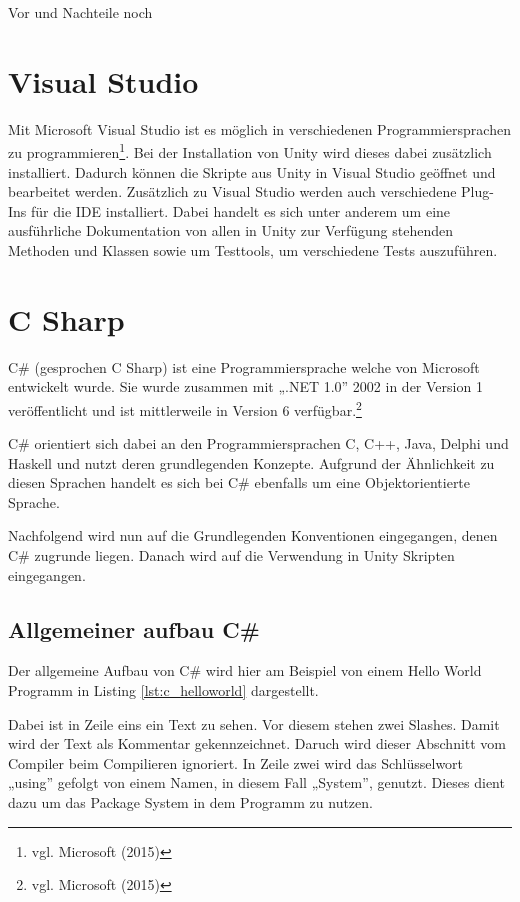 Vor und Nachteile noch

\section{Visual Studio}

Mit Microsoft Visual Studio ist es möglich in verschiedenen Programmiersprachen zu programmieren\footnote{vgl. Microsoft \cite{microsoft1} (2015)}.
Bei der Installation von Unity wird dieses dabei zusätzlich installiert. Dadurch können die Skripte aus Unity in Visual Studio geöffnet und bearbeitet werden. Zusätzlich zu Visual Studio werden auch verschiedene Plug-Ins für die IDE installiert. Dabei handelt es sich unter anderem um eine ausführliche Dokumentation von allen in Unity zur Verfügung stehenden Methoden und Klassen sowie um Testtools, um verschiedene Tests auszuführen. 

\section{C Sharp}

C\# (gesprochen C Sharp) ist eine Programmiersprache welche von Microsoft entwickelt wurde. Sie wurde zusammen mit „.NET 1.0” 2002 in der Version 1 veröffentlicht und ist mittlerweile in Version 6 verfügbar.\footnote{vgl. Microsoft \cite{microsoft2} (2015)} 

C\# orientiert sich dabei an den Programmiersprachen C, C++, Java, Delphi und Haskell und nutzt deren grundlegenden Konzepte. Aufgrund der Ähnlichkeit zu diesen Sprachen handelt es sich bei C\# ebenfalls um eine Objektorientierte Sprache. 

Nachfolgend wird nun auf die Grundlegenden Konventionen eingegangen, denen C\# zugrunde liegen. Danach wird auf die Verwendung in Unity Skripten eingegangen.

\subsection{Allgemeiner aufbau C\#}

Der allgemeine Aufbau von C\# wird hier am Beispiel von einem Hello World Programm in Listing \ref{lst:c_helloworld} dargestellt. 

Dabei ist in Zeile eins ein Text zu sehen. Vor diesem stehen zwei Slashes. Damit wird der Text als Kommentar gekennzeichnet. Daruch wird dieser Abschnitt vom Compiler beim Compilieren ignoriert. In Zeile zwei wird das Schlüsselwort „using” gefolgt von einem Namen, in diesem Fall „System”, genutzt. Dieses dient dazu um das Package System in dem Programm zu nutzen.

